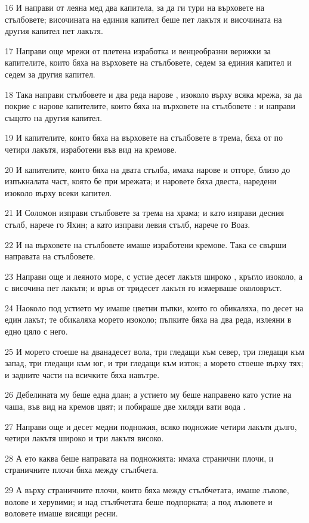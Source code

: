 \par 16 И направи от леяна мед два капитела, за да ги тури на върховете на стълбовете; височината на единия капител беше пет лакътя и височината на другия капител пет лакътя.
\par 17 Направи още мрежи от плетена изработка и венцеобразни верижки за капителите, които бяха на върховете на стълбовете, седем за единия капител и седем за другия капител.
\par 18 Така направи стълбовете и два реда нарове , изоколо върху всяка мрежа, за да покрие с нарове капителите, които бяха на върховете на стълбовете : и направи същото на другия капител.
\par 19 И капителите, които бяха на върховете на стълбовете в трема, бяха от по четири лакътя, изработени във вид на кремове.
\par 20 И капителите, които бяха на двата стълба, имаха нарове и отгоре, близо до изпъкналата част, която бе при мрежата; и наровете бяха двеста, наредени изоколо върху всеки капител.
\par 21 И Соломон изправи стълбовете за трема на храма; и като изправи десния стълб, нарече го Яхин; а като изправи левия стълб, нарече го Воаз.
\par 22 И на върховете на стълбовете имаше изработени кремове. Така се свърши направата на стълбовете.
\par 23 Направи още и леяното море, с устие десет лакътя широко , кръгло изоколо, а с височина пет лакътя; и връв от тридесет лакътя го измерваше околовръст.
\par 24 Наоколо под устието му имаше цветни пъпки, които го обикаляха, по десет на един лакът; те обикаляха морето изоколо; пъпките бяха на два реда, излеяни в едно цяло с него.
\par 25 И морето стоеше на дванадесет вола, три гледащи към север, три гледащи към запад, три гледащи към юг, и три гледащи към изток; а морето стоеше върху тях; и задните части на всичките бяха навътре.
\par 26 Дебелината му беше една длан; а устието му беше направено като устие на чаша, във вид на кремов цвят; и побираше две хиляди вати вода .
\par 27 Направи още и десет медни подножия, всяко подножие четири лакътя дълго, четири лакътя широко и три лакътя високо.
\par 28 А ето каква беше направата на подножията: имаха странични плочи, и страничните плочи бяха между стълбчета.
\par 29 А върху страничните плочи, които бяха между стълбчетата, имаше лъвове, волове и херувими; и над стълбчетата беше подпорката; а под лъвовете и воловете имаше висящи ресни.
